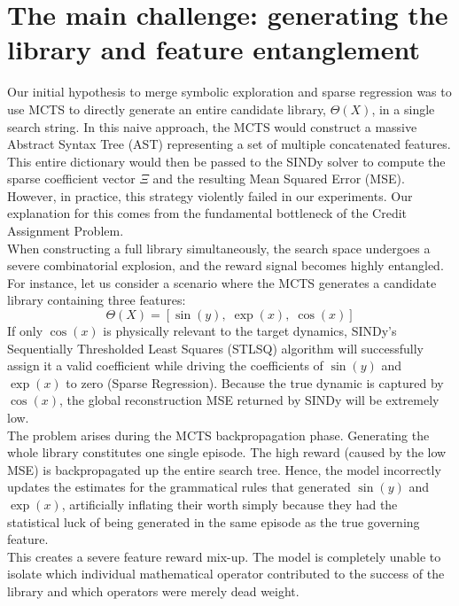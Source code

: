 \documentclass[11pt, a4paper]{article}
\begin{document}
\section{The main challenge: generating the library and feature entanglement}
\label{sec:main_challenge}

Our initial hypothesis to merge symbolic exploration and sparse regression was to use MCTS to directly generate an entire candidate library, $\Theta(X)$, in a single search string. In this naive approach, the MCTS would construct a massive Abstract Syntax Tree (AST) representing a set of multiple concatenated features. This entire dictionary would then be passed to the SINDy solver to compute the sparse coefficient vector $\Xi$ and the resulting Mean Squared Error (MSE). However, in practice, this strategy violently failed in our experiments. Our explanation for this comes from the fundamental bottleneck of the Credit Assignment Problem. \\

When constructing a full library simultaneously, the search space undergoes a severe combinatorial explosion, and the reward signal becomes highly entangled. For instance, let us consider a scenario where the MCTS generates a candidate library containing three features:
\begin{equation}
    \Theta(X) = [\sin(y), \; \exp(x), \; \cos(x)]
\end{equation}
If only $\cos(x)$ is physically relevant to the target dynamics, SINDy's Sequentially Thresholded Least Squares (STLSQ) algorithm will successfully assign it a valid coefficient while driving the coefficients of $\sin(y)$ and $\exp(x)$ to zero (Sparse Regression). Because the true dynamic is captured by $\cos(x)$, the global reconstruction MSE returned by SINDy will be extremely low.\\

The problem arises during the MCTS backpropagation phase. Generating the whole library constitutes one single episode. The high reward (caused by the low MSE) is backpropagated up the entire search tree. Hence, the model incorrectly updates the estimates for the grammatical rules that generated $\sin(y)$ and $\exp(x)$, artificially inflating their worth simply because they had the statistical luck of being generated in the same episode as the true governing feature. \\

This creates a severe feature reward mix-up. The model is completely unable to isolate which individual mathematical operator contributed to the success of the library and which operators were merely dead weight. \\
\end{document}

